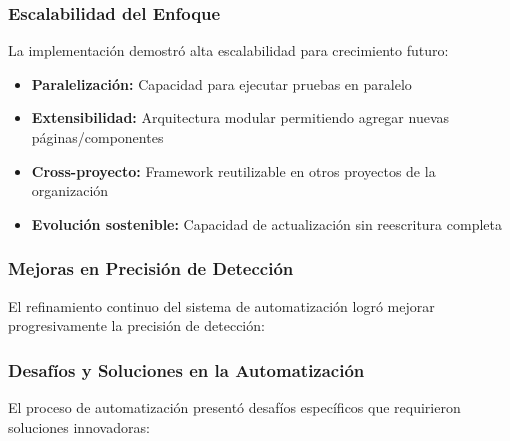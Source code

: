 \documentclass{article}
\begin{document}
\subsubsection{Escalabilidad del Enfoque}

La implementación demostró alta escalabilidad para crecimiento futuro:

\begin{itemize}[nosep]
\item \textbf{Paralelización:} Capacidad para ejecutar pruebas en paralelo
\item \textbf{Extensibilidad:} Arquitectura modular permitiendo agregar nuevas páginas/componentes
\item \textbf{Cross-proyecto:} Framework reutilizable en otros proyectos de la organización
\item \textbf{Evolución sostenible:} Capacidad de actualización sin reescritura completa
\end{itemize}

\subsubsection{Mejoras en Precisión de Detección}

El refinamiento continuo del sistema de automatización logró mejorar progresivamente la precisión de detección:


\subsubsection{Desafíos y Soluciones en la Automatización}

El proceso de automatización presentó desafíos específicos que requirieron soluciones innovadoras:
\end{document}
